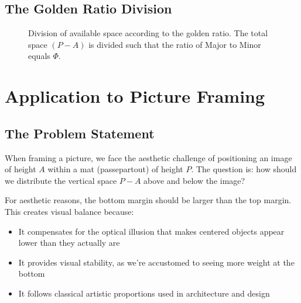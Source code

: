 \documentclass[12pt,a4paper]{article}
\begin{document}
\subsection{The Golden Ratio Division}

\begin{figure}[h!]
\centering
{}
\caption{Division of available space according to the golden ratio. The total space $(P-A)$ is divided such that the ratio of Major to Minor equals $\Phi$.}
\end{figure}

\section{Application to Picture Framing}

\subsection{The Problem Statement}

When framing a picture, we face the aesthetic challenge of positioning an image of height $A$ within a mat (passepartout) of height $P$. The question is: how should we distribute the vertical space $P - A$ above and below the image?

For aesthetic reasons, the bottom margin should be larger than the top margin. This creates visual balance because:

\begin{itemize}
    \item It compensates for the optical illusion that makes centered objects appear lower than they actually are
    \item It provides visual stability, as we're accustomed to seeing more weight at the bottom
    \item It follows classical artistic proportions used in architecture and design
\end{itemize}
\end{document}
